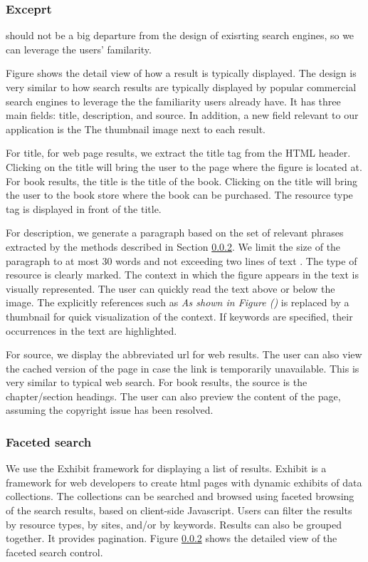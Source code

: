 \documentclass{www2010-submission}
\begin{document}
\subsubsection{Exceprt}

should not be a big departure from the design of exisrting search
engines, so we can leverage the users' familarity.

Figure shows the detail view of how a result is typically
displayed. The design is very similar to how search results are
typically displayed by popular commercial search engines to
leverage the the familiarity users already have. It has three main
fields: title, description, and source. In
addition, a new field relevant to our application is the The
thumbnail image next to each result.

For title, for web page results, we extract the title tag from the
HTML header. Clicking on the title will bring the user to the page
where the figure is located at. For book results, the title is the
title of the book. Clicking on the title will bring the user to
the book store where the book can be purchased. The resource type
tag is displayed in front of the title.

For description, we generate a paragraph based on the set of relevant
phrases extracted by the methods described in Section \ref{}. We limit
the size of the paragraph to at most 30 words and not exceeding two
lines of text . The type of resource is clearly marked. The context in
which the figure appears in the text is visually represented. The user
can quickly read the text above or below the image. The explicitly
references such as \emph{As shown in Figure ()} is replaced by a
thumbnail for quick visualization of the context. If keywords are
specified, their occurrences in the text are highlighted.

For source, we display the abbreviated url for web results. The
user can also view the cached version of the page in case the link
is temporarily unavailable. This is very similar to typical web
search. For book results, the source is the chapter/section
headings. The user can also preview the content of the page,
assuming the copyright issue has been resolved.

\subsubsection{Faceted search}

We use the Exhibit framework for displaying a list of results.
Exhibit is a framework for web developers to create html pages
with dynamic exhibits of data collections. The collections can be
searched and browsed using faceted browsing of the search results,
based on client-side Javascript. Users can filter the results by
resource types, by sites, and/or by keywords. Results can also be
grouped together. It provides pagination. Figure \ref{} shows the
detailed view of the faceted search control.
\end{document}
